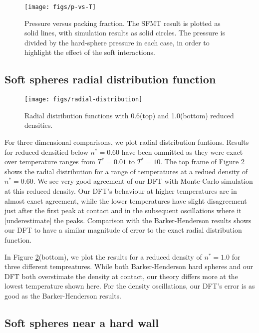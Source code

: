 \documentclass[letterpaper,twocolumn,amsmath,amssymb,prb]{revtex4-1}
\newcommand{\red}[1]{{\color{red} #1}}
\newcommand{\fixme}[1]{\red{[#1]}}
\begin{document}
\begin{figure}
\begin{center}
\texttt{[image: figs/p-vs-T]}
\end{center}
\caption{Pressure versus packing fraction.  The SFMT result is plotted
  as solid lines, with simulation results as solid circles.  The
  pressure is divided by the hard-sphere pressure in each case, in
  order to highlight the effect of the soft interactions.}
\label{fig:p-vs-packing}
\end{figure}

\subsection{Soft spheres radial distribution function}

\begin{figure}
\begin{center}
\texttt{[image: figs/radial-distribution]}
\end{center}
\caption{Radial distribution functions with 0.6(top) and 1.0(bottom) reduced densities.}
\label{fig:radial-distribution}
\end{figure}

For three dimensional comparisons, we plot radial distribution
funtions.  Results for reduced densitied below $n^* = 0.60$ have been
ommitted as they were exact over temperature ranges from $T^*=0.01$ to
$T^*=10$. The top frame of Figure \ref{fig:radial-distribution} shows
the radial distribution for a range of temperatures at a redued
density of $n^* = 0.60$. We see very good agreement of our DFT with
Monte-Carlo simulation at this reduced density. Our DFT's behaviour at
higher temperatures are in almost exact agreement, while the lower
temperatures have slight disagreement just after the first peak at
contact and in the subsequent oscillations where it
\fixme{underestimate} the peaks. Comparison with the Barker-Henderson
results shows our DFT to have a similar magnitude of error to the
exact radial distribution function.

In Figure \ref{fig:radial-distribution}(bottom), we plot the results
for a reduced density of $n^*=1.0$ for three different
tempreatures. While both Barker-Henderson hard spheres and our DFT
both overstimate the density at contact, our theory differs more at
the lowest temperature shown here. For the density oscillations, our
DFT's error is as good as the Barker-Henderson results.

\subsection{Soft spheres near a hard wall}
\end{document}
